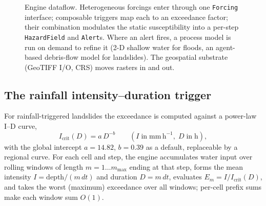\documentclass[authoryear,preprint,review,12pt]{elsarticle}
\begin{document}
\begin{figure}[t]
\centering
{}
\caption{Engine dataflow. Heterogeneous forcings enter through one
\texttt{Forcing} interface; composable triggers map each to an exceedance factor;
their combination modulates the static susceptibility into a per-step
\texttt{HazardField} and \texttt{Alert}s. Where an alert fires, a process model is
run on demand to refine it (2-D shallow water for floods, an agent-based
debris-flow model for landslides). The geospatial substrate (GeoTIFF I/O, CRS)
moves rasters in and out.}
\label{fig:arch}
\end{figure}

\subsection{The rainfall intensity--duration trigger}

For rainfall-triggered landslides the exceedance is computed against a power-law
I--D curve,
\begin{equation}
I_{\mathrm{crit}}(D)=a\,D^{-b}\qquad(I\;\mathrm{in\;mm\,h^{-1}},\;D\;\mathrm{in\;h}),
\label{eq:id}
\end{equation}
with the \citet{caine1980} global intercept $a=14.82$, $b=0.39$ as a default,
replaceable by a regional curve. For each cell and step, the engine accumulates
water input over rolling windows of length $m=1\ldots m_{\max}$ ending at that
step, forms the mean intensity $I=\mathrm{depth}/(m\,dt)$ and duration $D=m\,dt$,
evaluates $E_m=I/I_{\mathrm{crit}}(D)$, and takes the worst (maximum) exceedance
over all windows; per-cell prefix sums make each window sum $O(1)$.
\end{document}
